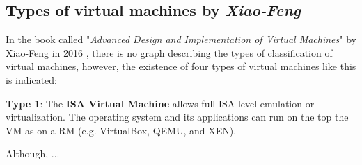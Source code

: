 	\subsection{Types of virtual machines by \textit{Xiao-Feng}}
	
	In the book called "\textit{Advanced Design and Implementation of Virtual Machines}" by Xiao-Feng in 2016 \cite{Xiao-Feng2016}, there is no graph describing the types of classification of virtual machines, however, the existence of four types of virtual machines like this is indicated:
	
	\textbf{Type 1}: The \textbf{ISA Virtual Machine} allows full ISA level emulation or virtualization. The operating system and its applications can run on the top the VM as on a RM (e.g. VirtualBox, QEMU, and XEN).
	
	Although,  ...
	